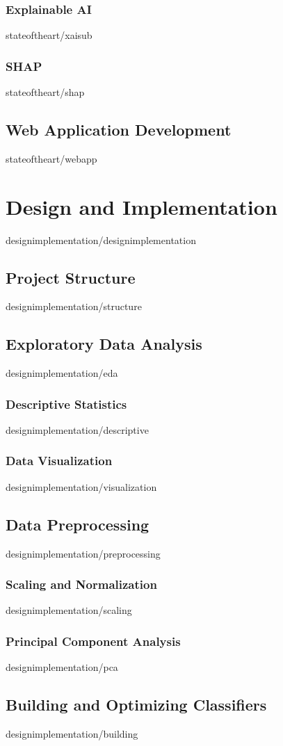 \documentclass[covers, firstnumbered, tfg, epsbased, english]{tfgtfmthesisuam}
\begin{document}
\subsection{Explainable AI}{stateoftheart/xaisub}
\subsection{SHAP}{stateoftheart/shap}

\section{Web Application Development}{stateoftheart/webapp}

\chapter{Design and Implementation}{designimplementation/designimplementation}

\section{Project Structure}{designimplementation/structure}
\section{Exploratory Data Analysis}{designimplementation/eda}
\subsection{Descriptive Statistics}{designimplementation/descriptive}
\subsection{Data Visualization}{designimplementation/visualization}
\section{Data Preprocessing}{designimplementation/preprocessing}
\subsection{Scaling and Normalization}{designimplementation/scaling}
\subsection{Principal Component Analysis}{designimplementation/pca}
\section{Building and Optimizing Classifiers}{designimplementation/building}
\end{document}
